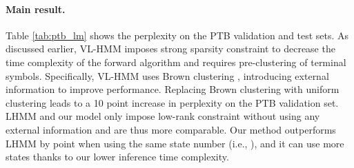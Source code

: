 \documentclass[11pt]{article}
\begin{document}
\paragraph{Main result.}
Table \ref{tab:ptb_lm} shows the perplexity on the PTB validation and test sets. As discussed earlier, VL-HMM \cite{chiu-rush-2020-scaling} imposes strong sparsity constraint to decrease the time complexity of the forward algorithm and requires pre-clustering of terminal symbols. Specifically, VL-HMM uses Brown clustering \cite{brown-etal-1992-class}, introducing external information to improve performance. Replacing Brown clustering with uniform clustering leads to a 10 point increase in perplexity on the PTB validation set. LHMM \cite{chiu2021low} and our model only impose low-rank constraint without using any external information and are thus more comparable. Our method outperforms LHMM by  point when using the same state number (i.e., ), and it can use more states thanks to our lower inference time complexity.

\begin{table}[tb!]
    \centering 
    \caption{Resulting perplexity on PTB validate set and test set. VL-HMM: \cite{chiu-rush-2020-scaling}. LHMM: \cite{chiu2021low}.
     denotes results reported by ablation study of \citet{chiu-rush-2020-scaling}.}
    \label{tab:ptb_lm}
\end{table}
\end{document}
